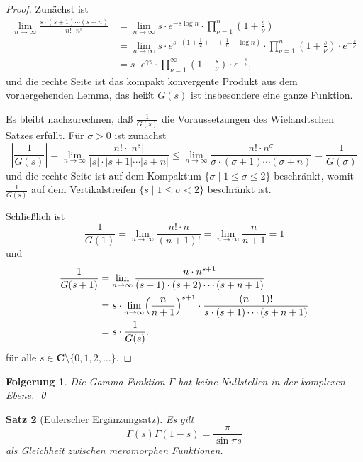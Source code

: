 \documentclass[a4paper,twoside,openright]{report}
\newtheorem{thm}{Satz}[chapter]
\newtheorem{cor}[thm]{Folgerung}
\theoremstyle{definition}
\theoremstyle{remark}
\begin{document}
\begin{proof}
  Zunächst ist
  \[
    \begin{split}
      \lim_{n \to \infty} \frac{s \cdot (s + 1) \dotsm (s + n)} {n! \cdot n^s}
      & =
      \lim_{n \to \infty} s \cdot e^{-s \log n} \cdot \prod_{\nu = 1}^n \left(1 + \frac s \nu\right)
      \\
      & = \lim_{n \to \infty} s \cdot e^{s \cdot (1 + \frac 1 2 + \dotsb + \frac 1 n - \log n)} \cdot \prod_{\nu = 1}^n (1 + \frac s \nu) \cdot e^{- \frac s \nu}
      \\
      & = s \cdot e^{\gamma s} \cdot \prod_{\nu = 1}^\infty \left(1 + \frac s \nu\right) \cdot e^{- \frac s \nu},
    \end{split}
  \]
  und die rechte Seite ist das kompakt konvergente Produkt aus dem
  vorhergehenden Lemma, das heißt $G(s)$ ist insbesondere eine ganze
  Funktion.
  
  Es bleibt nachzurechnen, daß $\frac 1 {G(s)}$ die Voraussetzungen des
  Wielandtschen Satzes erfüllt. Für $\sigma > 0$ ist zunächst
  \[
    \left|\frac 1 {G(s)}\right| = \lim_{n \to \infty} \frac{n! \cdot |n^s|}{|s| \cdot |s + 1| \dotsm |s + n|}
    \leq \lim_{n \to \infty} \frac{n! \cdot n^\sigma}{\sigma \cdot (\sigma + 1) \dotsm (\sigma + n)}
    = \frac 1 {G(\sigma)}
  \]
  und die rechte Seite ist auf dem Kompaktum $\{\sigma \mid 1 \leq \sigma \leq 2\}$
  beschränkt, womit $\frac 1 {G(s)}$ auf dem Vertikalstreifen $\{s \mid 1 \leq \sigma < 2\}$
  beschränkt ist.
  
  Schließlich ist
  \[
    \frac 1 {G(1)} = \lim_{n \to \infty} \frac{n! \cdot n}{(n + 1)!}
    = \lim_{n \to \infty} \frac n {n + 1} = 1
  \]
  und
  \[
    \begin{split}
      \frac 1 {G(s + 1)} & = \lim_{n \to \infty} \frac{n \cdot n^{s + 1}}{(s + 1) \cdot (s + 2) \dotsm (s + n + 1)}
      \\
      & = s \cdot \lim_{n \to \infty} \Bigl(\frac n {n + 1}\Bigr)^{s + 1} \cdot \frac{(n + 1)!}{s \cdot (s + 1) \dotsm (s + n + 1)}
      \\
      & = s \cdot \frac 1 {G(s)}.
    \end{split}
  \]
  für alle $s \in \mathbf C \setminus \{0, 1, 2, \dotsc\}$.
\end{proof}

\begin{cor}
  Die Gamma-Funktion $\Gamma$ hat keine Nullstellen in der komplexen Ebene.
  \qed
\end{cor}

\begin{thm}[Eulerscher Ergänzungsatz]
  Es gilt
  \[
    \Gamma(s) \Gamma(1 - s) = \frac{\pi}{\sin \pi s}
  \]
  als Gleichheit zwischen meromorphen Funktionen.
\end{thm}
\end{document}
